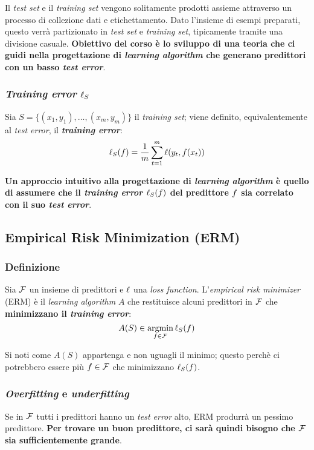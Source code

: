 \vspace{1em}

\begin{figure}[h]
    \centering
    
\end{figure}

Il \textit{test set} e il \textit{training set} vengono solitamente prodotti assieme
attraverso un processo di collezione dati e etichettamento. Dato l'insieme di esempi
preparati, questo verrà partizionato in \textit{test set} e \textit{training set},
tipicamente tramite una divisione casuale. \textbf{Obiettivo del corso è lo sviluppo
di una teoria che ci guidi nella progettazione di \textit{learning algorithm} che
generano predittori con un basso \textit{test error}}.

\subsubsection{\textit{Training error} \texorpdfstring{$\ell_S$}{l}}
Sia $S = \{(x_1,y_1),\dots,(x_m,y_m)\}$ il \textit{training set}; viene definito,
equivalentemente al \textit{test error}, il \textbf{\textit{training error}}:
$$ \ell_S(f) = \frac{1}{m}\sum_{t=1}^m \ell(y_t,f(x_t)) $$

\textbf{Un approccio intuitivo alla progettazione di \textit{learning algorithm} è 
quello di assumere che il \textit{training error} $\ell_S(f)$ del predittore 
$f$ sia correlato con il suo \textit{test error}}.

\subsection{Empirical Risk Minimization (ERM)}
\subsubsection{Definizione}
Sia $\mathcal{F}$ un insieme di predittori e $\ell$ una \textit{loss function}.
L'\textit{empirical risk minimizer} (ERM) è il \textit{learning algorithm} $A$
che restituisce alcuni predittori in $\mathcal{F}$ che \textbf{minimizzano il 
\textit{training error}}:
$$ A(S) \in \operatorname*{argmin}_{f \in \mathcal{F}} \ell_S(f) $$

Si noti come $A(S)$ appartenga e non uguagli il minimo; questo perchè ci 
potrebbero essere più $f \in \mathcal{F}$ che minimizzano $\ell_S(f)$.

\subsubsection{\textit{Overfitting} e \textit{underfitting}}
Se in $\mathcal{F}$ tutti i predittori hanno un \textit{test error} alto, ERM produrrà
un pessimo predittore. \textbf{Per trovare un buon predittore, ci sarà quindi
bisogno che $\mathcal{F}$ sia sufficientemente grande}.


